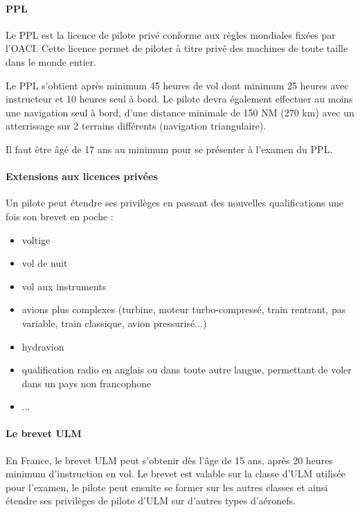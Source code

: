 	\paragraph{PPL}
	Le PPL  est la licence de pilote privé conforme aux règles mondiales fixées par l'OACI. Cette licence permet de piloter à titre privé des machines de toute taille dans le monde entier.
	
	
	Le PPL s'obtient après minimum 45 heures de vol dont minimum 25 heures avec instructeur et 10 heures seul à bord. Le pilote devra également effectuer au moins une navigation seul à bord, d'une distance minimale de 150 NM (270 km) avec un atterrissage sur 2 terrains différents (navigation triangulaire).
	
	Il faut être âgé de 17 ans au minimum pour se présenter à l'examen du PPL.
	
	\paragraph{Extensions aux licences privées}
	Un pilote peut étendre ses privilèges en passant des nouvelles qualifications une fois son brevet en poche :
	\begin{itemize}
		\item voltige
		\item vol de nuit
		\item vol aux instruments
		\item avions plus complexes (turbine, moteur turbo-compressé, train rentrant, pas variable, train classique, avion pressurisé...)
		\item hydravion
		\item qualification radio en anglais ou dans toute autre langue, permettant de voler dans un pays non francophone
		\item  ...
	\end{itemize}
	
	\paragraph{Le brevet ULM}
	En France, le brevet ULM peut s'obtenir dès l'âge de 15 ans, après 20 heures minimum d'instruction en vol. Le brevet est valable sur la classe d'ULM utilisée pour l'examen, le pilote peut ensuite se former sur les autres classes et ainsi étendre ses privilèges de pilote d'ULM sur d'autres types d'aéronefs.
	

